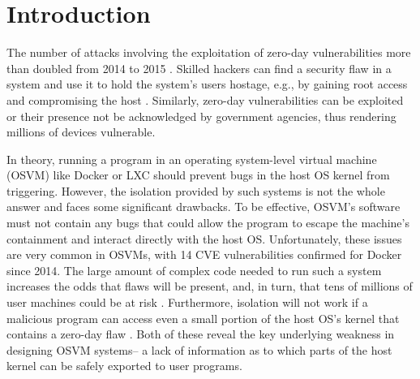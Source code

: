 \section{Introduction}
\label{sec.introduction}

The number of attacks involving the exploitation of zero-day vulnerabilities more than doubled 
from 2014 to 2015 \cite{zero-day}. Skilled hackers can find a security flaw in a system and use it to hold the system's users hostage, e.g., 
by gaining root access and compromising the host \cite{linux-0day}. Similarly, zero-day
vulnerabilities can be exploited \cite{fbi-0day} or their presence not be acknowledged \cite{nsa-0day} 
by government agencies, thus rendering millions of devices vulnerable.

In theory, running a program in an operating system-level virtual machine (OSVM) like Docker \cite{Docker} or LXC \cite{LXC} should
prevent bugs in the host OS kernel from triggering. 
However, the isolation provided by such systems is not the whole answer and faces some significant drawbacks. 
To be effective, OSVM's software must not contain any bugs that could allow the program to escape the machine's containment 
and interact directly with the host OS. 
Unfortunately, these issues are very common in OSVMs, with 14 CVE vulnerabilities confirmed for Docker \cite{Docker-Vulnerabilities} since 2014. 
The large amount of complex code needed to run such a system increases the odds that flaws will be present, and, in turn, 
that tens of millions of user machines could be at risk \cite{linux-0day}.
Furthermore, isolation will not work if a malicious program can access even a small portion of the host OS's kernel 
that contains a zero-day flaw \cite{CVE-2016-5195}. 
Both of these reveal the key underlying weakness in designing OSVM systems-- a lack of information 
as to which parts of the host kernel can be safely exported to user programs. 

